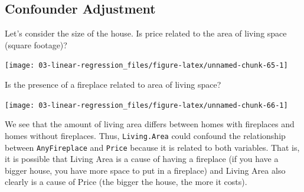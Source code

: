 \documentclass[
]{book}
\newenvironment{Shaded}{\begin{snugshade}}{\end{snugshade}}
\newcommand{\DataTypeTok}[1]{\textcolor[rgb]{0.13,0.29,0.53}{#1}}
\newcommand{\KeywordTok}[1]{\textcolor[rgb]{0.13,0.29,0.53}{\textbf{#1}}}
\newcommand{\NormalTok}[1]{#1}
\newcommand{\OperatorTok}[1]{\textcolor[rgb]{0.81,0.36,0.00}{\textbf{#1}}}
\newcommand{\StringTok}[1]{\textcolor[rgb]{0.31,0.60,0.02}{#1}}
\begin{document}
\hypertarget{confounder-adjustment}{%
\subsection{Confounder Adjustment}\label{confounder-adjustment}}

Let's consider the size of the house. Is price related to the area of living space (square footage)?

\begin{Shaded}
\end{Shaded}

\begin{center}\texttt{[image: 03-linear-regression\_files/figure-latex/unnamed-chunk-65-1]} \end{center}

Is the presence of a fireplace related to area of living space?

\begin{Shaded}
\end{Shaded}

\begin{center}\texttt{[image: 03-linear-regression\_files/figure-latex/unnamed-chunk-66-1]} \end{center}

We see that the amount of living area differs between homes with fireplaces and homes without fireplaces. Thus, \texttt{Living.Area} could confound the relationship between \texttt{AnyFireplace} and \texttt{Price} because it is related to both variables. That is, it is possible that Living Area is a cause of having a fireplace (if you have a bigger house, you have more space to put in a fireplace) and Living Area also clearly is a cause of Price (the bigger the house, the more it costs).
\end{document}
